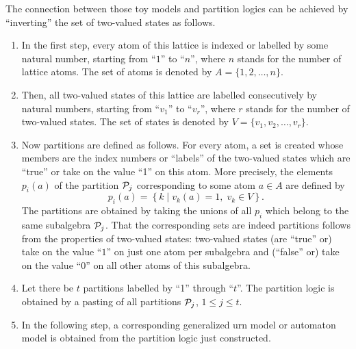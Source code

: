 The connection between those toy models and partition logics
can be achieved by ``inverting'' the set of two-valued states as follows.
\begin{enumerate}
\item
In the first step, every atom of this lattice is indexed or labelled by some natural number,
starting from ``$1$'' to ``$n$'', where $n$  stands for the number of lattice atoms.
The set of atoms is denoted by $A=\{1,2,\ldots , n\}$.

\item
Then, all two-valued states of this lattice are labelled consecutively
by natural numbers, starting from ``$v_1$'' to ``$v_r$'', where $r$  stands for the number of
two-valued states.
The set of states is denoted by $V=\{v_1,v_2,\ldots , v_r\}$.

\item
Now  partitions are defined as follows.
For every atom, a set is created whose members are the index numbers or ``labels'' of
the two-valued states which are ``true'' or take on the value ``1'' on this atom.
More precisely,
the elements $p_i(a)$ of the partition ${\cal P}_j$ corresponding to
some atom $a\in A$ are defined by
$$p_i (a) =
\left\{
k \mid v_k(a)=1, \; v_k\in V
\right\}
.
$$
The partitions are obtained by taking the unions of all $p_i$ which belong to the same
subalgebra ${\cal P}_j$.
That the corresponding sets are indeed partitions follows from the properties of
two-valued states: two-valued states (are ``true'' or) take on the value ``$1$'' on just one atom
per subalgebra and (``false'' or) take on the value ``$0$'' on all other atoms of this subalgebra.

\item
Let there be $t$ partitions labelled by ``1'' through ``$t$''.
The partition logic is obtained by a pasting of all partitions
${\cal P}_j$, $1\le j \le t$.


\item  In the following step, a corresponding  generalized urn model  or automaton model is
obtained from the partition logic just constructed.


\end{enumerate}
